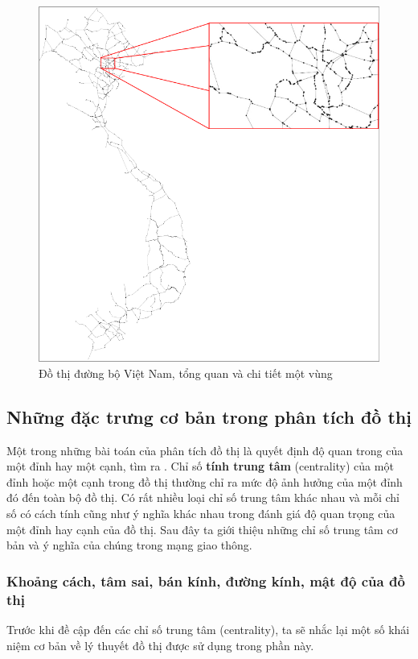 \documentclass[14pt, oneside, a4paper, openany]{scrartcl}
\begin{document}
\begin{figure}[!h]
	\centering
	\includegraphics[scale=0.6]{figures/vnroadgraphtotaledit.png} 
	\caption[Đồ thị đường bộ Việt Nam]{Đồ thị đường bộ Việt Nam, tổng quan và chi tiết một vùng}
	\label{fig:vnhighwaynet}
\end{figure}

\subsection{Những đặc trưng cơ bản trong phân tích đồ thị}
Một trong những bài toán của phân tích đồ thị là quyết định độ quan trong của một đỉnh hay một cạnh, tìm ra . Chỉ số \textbf{tính trung tâm}  (centrality) của một đỉnh hoặc một cạnh trong đồ thị thường chỉ ra mức độ ảnh hưởng của một đỉnh đó đến toàn bộ đồ thị. Có rất nhiều loại chỉ số trung tâm khác nhau và mỗi chỉ số có cách tính cũng như ý nghĩa khác nhau trong đánh giá độ quan trọng của một đỉnh hay cạnh của đồ thị. Sau đây ta giới thiệu những chỉ số trung tâm cơ bản và ý nghĩa của chúng trong mạng giao thông.

\subsubsection{Khoảng cách, tâm sai, bán kính, đường kính, mật độ của đồ thị}
Trước khi đề cập đến các chỉ số trung tâm (centrality), ta sẽ nhắc lại một số khái niệm cơ bản về lý thuyết đồ thị được sử dụng trong phần này.
\end{document}
